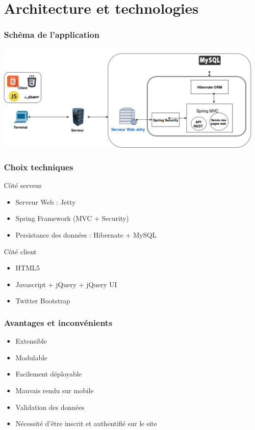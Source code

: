 \documentclass{beamer}
\begin{document}
\section{Architecture et technologies}
\begin{frame}
    \frametitle{Schéma de l'application}
    \begin{center}
        \includegraphics[scale=0.3]{../report/illus/appschema.png}
    \end{center}
\end{frame}

\begin{frame}
    \frametitle{Choix techniques}
    Côté serveur
    \begin{itemize}
        \item Serveur Web : Jetty
        \item Spring Framework (MVC + Security)
        \item Persistance des données : Hibernate + MySQL
    \end{itemize}

    Côté client
    \begin{itemize}
        \item HTML5
        \item Javascript + jQuery + jQuery UI
        \item Twitter Bootstrap
    \end{itemize}
\end{frame}


\begin{frame}
    \frametitle{Avantages et inconvénients}
    \begin{itemize}
      \item<pro@1-> Extensible \pause
      \item<pro@1-> Modulable \pause
      \item<pro@1-> Facilement déployable \pause
      \item<con@1-> Mauvais rendu sur mobile \pause
      \item<con@1-> Validation des données \pause
      \item<con@1-> Nécessité d'être inscrit et authentifié sur le site
    \end{itemize}
\end{frame}
\end{document}
